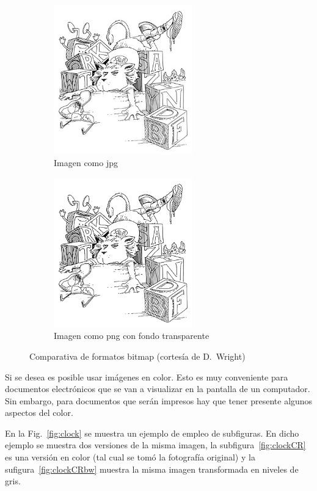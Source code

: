 \documentclass[11pt,a4paper]{article}
\begin{document}
\begin{figure}[hbt]
	\centering
  	\begin{subfigure}[b]{0.4\linewidth}
  		\centering
		\includegraphics[width=6cm]{lionL.jpg}
		\caption{Imagen como jpg}\label{fig:lionLjpg}
  	\end{subfigure}
  	\begin{subfigure}[b]{0.4\linewidth}
  		\centering
		\includegraphics[width=6cm]{lionL.png}
		\caption{Imagen como png con fondo transparente}\label{fig:lionpng}
  	\end{subfigure}
  	\caption[Comparación jpg y png con transparencia]{Comparativa de formatos bitmap (cortesía de D.~Wright)}
	\label{fig:lion}
\end{figure}

Si se desea es posible usar imágenes en color. Esto es muy conveniente para documentos electrónicos que se van a visualizar en la pantalla de un computador. Sin embargo, para documentos que serán impresos hay que tener presente algunos aspectos del color. 

En la Fig.~\ref{fig:clock} se muestra un ejemplo de empleo de subfiguras. En dicho ejemplo se muestra dos versiones de la misma imagen, la subfigura~\ref{fig:clockCR} es una versión en color (tal cual se tomó la fotografía original) y la sufigura~\ref{fig:clockCRbw} muestra la misma imagen transformada en niveles de gris.
\end{document}
